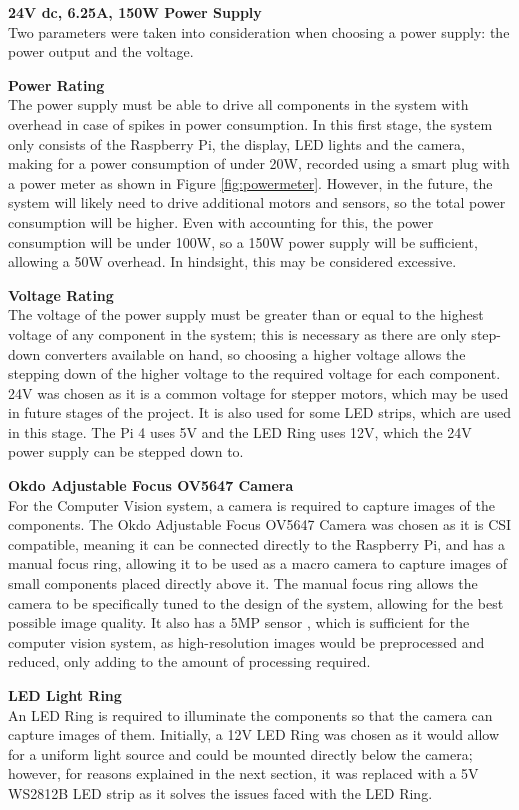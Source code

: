 \vspace{1em}
\noindent
\textbf{24V dc, 6.25A, 150W Power Supply} \\
Two parameters were taken into consideration when choosing a power supply: the power output and the voltage.
\begin{mylist}
  \item \textbf{Power Rating} \\
  The power supply must be able to drive all components in the system with overhead in case of spikes in power consumption.
  In this first stage, the system only consists of the Raspberry Pi, the display, LED lights and the camera, 
  making for a power consumption of under 20W, recorded using a smart plug with a power meter as shown in Figure \ref{fig:powermeter}.
  However, in the future, the system will likely need to drive additional motors and sensors, so the total power consumption
  will be higher. Even with accounting for this, the power consumption will be under 100W, so a 150W power supply will be sufficient,
  allowing a 50W overhead. In hindsight, this may be considered excessive.
  \item \textbf{Voltage Rating} \\
  The voltage of the power supply must be greater than or equal to the highest voltage of any component in the system; this is necessary
  as there are only step-down converters available on hand, so choosing a higher voltage allows the stepping down of the higher voltage 
  to the required voltage for each component. 24V was chosen as it is a common voltage for stepper motors, which may be used in
  future stages of the project. It is also used for some LED strips, which are used in this stage. The Pi 4 uses 5V and the LED Ring
  uses 12V, which the 24V power supply can be stepped down to.
\end{mylist}

\noindent
\textbf{Okdo Adjustable Focus OV5647 Camera} \\
For the Computer Vision system, a camera is required to capture images of the components. The Okdo Adjustable Focus OV5647 Camera
was chosen as it is CSI compatible, meaning it can be connected directly to the Raspberry Pi, and has a manual focus ring, allowing
it to be used as a macro camera to capture images of small components placed directly above it. The manual focus ring allows the camera
to be specifically tuned to the design of the system, allowing for the best possible image quality. It also
has a 5MP sensor \cite{okdospec}, which is sufficient for the computer vision system, as high-resolution images would be preprocessed and reduced,
only adding to the amount of processing required.

\vspace{1em}
\noindent
\textbf{LED Light Ring} \\
An LED Ring is required to illuminate the components so that the camera can capture images of them.
Initially, a 12V LED Ring was chosen as it would allow for a uniform light source and could be mounted directly below the camera; 
however, for reasons explained in the next section, it was replaced with a 5V WS2812B LED strip as it solves the issues
faced with the LED Ring.
